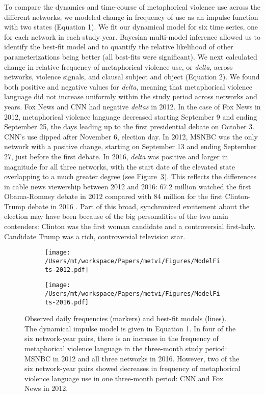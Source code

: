 To compare the dynamics and time-course of metaphorical violence use across the
different networks, we modeled change in frequency of use as an impulse function
with two states (Equation 1). We fit our dynamical
model for six time series, one for each network in each study year. Bayesian
multi-model inference allowed us to identify the best-fit model and to quantify
the relative likelihood of other parameterizations being better (all best-fits were
significant). We next calculated change in relative frequency of metaphorical
violence use, or \emph{delta}, across networks, violence signals, and clausal
subject and object (Equation 2). We found both positive and negative values for \emph{delta},
meaning that metaphorical violence language did not increase uniformly within
the study period across networks and years. Fox News and CNN had negative
\emph{deltas} in 2012. In the case of Fox News in 2012, metaphorical violence
language decreased starting September 9 and ending September 25, the days
leading up to the first presidential debate on October 3. CNN's use dipped after
November 6, election day. In 2012, MSNBC was the only network with a positive
change, starting on September 13 and ending September 27, just before the first
debate. In 2016, \emph{delta} was positive and larger in magnitude for all three
networks, with the start date of the elevated state overlapping to a much
greater degree (see Figure~\ref{fig:ModelFits}). This reflects the differences in cable news
viewership between 2012 and 2016: 67.2 million watched the first
Obama-Romney debate in 2012 compared with 84 million for the first Clinton-Trump
debate in 2016 \cite{Perlberg2016}.  Part of this broad, synchronized excitement about 
the election 	may have been because of the big personalities of the two main contenders: 
Clinton was the first woman candidate and a controversial
first-lady.  Candidate Trump was a rich, controversial television star.

\begin{figure}[H]
  \vspace{.2in}
  \centering
  \begin{subfigure}{0.7\linewidth}
    \centering
    \texttt{[image: /Users/mt/workspace/Papers/metvi/Figures/ModelFits-2012.pdf]}
   \caption{}
    \label{fig:ModelFits-2012}
  \end{subfigure}
  \begin{subfigure}{0.7\linewidth}
    \centering
    \texttt{[image: /Users/mt/workspace/Papers/metvi/Figures/ModelFits-2016.pdf]}
   \caption{}
    \label{fig:ModelFits-2016}
  \end{subfigure}

  \caption{Observed daily frequencies (markers) and best-fit models (lines).
    The dynamical impulse model is given in 
    Equation 1. In four of the six network-year pairs, 
    there is an increase in the frequency of metaphorical violence language in the
    three-month study period: MSNBC in 2012 and all three networks in 2016. 
    However, two of the six network-year pairs showed decreases in frequency
    of metaphorical violence language use in one three-month period: CNN and Fox News
    in 2012. 
  } 
  \label{fig:ModelFits}
\end{figure}

